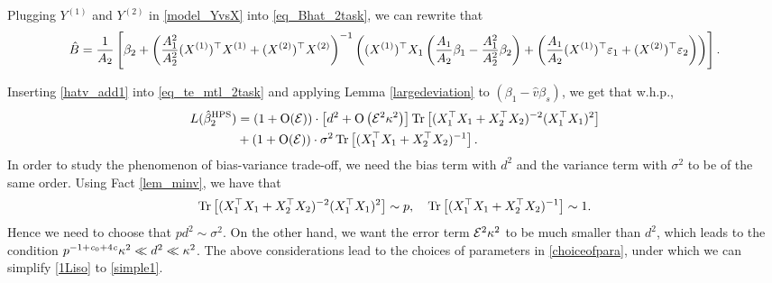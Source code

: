  \nc
 
Plugging $Y^{(1)}$ and $Y^{(2)}$ in \eqref{model_YvsX} into \eqref{eq_Bhat_2task}, we can rewrite that 
 \begin{align}
		\hat{B}= \frac{1}{A_2}\left[\beta_2 + \left(\frac{A_1^2}{A_2^2}(X^{(1)})^{\top}X^{(1)} +  (X^{(2)})^{\top}X^{(2)}\right)^{-1}\bigbrace{ (X^{(1)})^{\top}X_1\left(\frac{A_1}{A_2}\beta_1 - \frac{A_1^2}{A_2^2} \beta_2\right) + \left(\frac{A_1}{A_2} (X^{(1)})^{\top}\varepsilon_1 + (X^{(2)})^{\top}\varepsilon_2\right)}\right]. \label{eq_Bhat_2task2} %
	\end{align}


 Inserting \eqref{hatv_add1} into \eqref{eq_te_mtl_2task} and applying Lemma  \ref{largedeviation} to $(\beta_1-\hat v\beta_s)$, we get that w.h.p.,
\begin{align}
\te(\hat{\beta}_2^{\MTL})&=(1+\OO(\cal E))\cdot \left[d^2 + \OO\left(\cal E^2 \kappa^2\right)\right] \tr\left[(X_1^{\top}X_1 +X_2^{\top}X_2)^{-2} (X_1^{\top}X_1)^2\right]\nonumber\\
&+(1+\OO(\cal E))\cdot \sigma^2  \bigtr{(X_1^{\top}X_1  + X_2^{\top}X_2)^{-1} }. \label{1Liso}
\end{align}
In order to study the phenomenon of bias-variance trade-off, we need the bias term with $d^2$ and the variance term with $\sigma^2$ to be of the same order. Using Fact \eqref{lem_minv}, we have that
$$\tr\left[(X_1^{\top}X_1 +X_2^{\top}X_2)^{-2} (X_1^{\top}X_1)^2\right] \sim p,\quad \bigtr{(X_1^{\top}X_1  + X_2^{\top}X_2)^{-1} } \sim 1.$$
Hence we need to choose that $p d^2 \sim \sigma^2$. On the other hand, we want the error term $\cal E^2 \kappa^2$ to be much smaller than $d^2$, which leads to the condition $p^{-1+\e_0+4\e}\kappa^2  \ll d^2 \ll \kappa^2$. The above considerations lead to the choices of parameters in \eqref{choiceofpara}, under which we can simplify \eqref{1Liso} to \eqref{simple1}.

